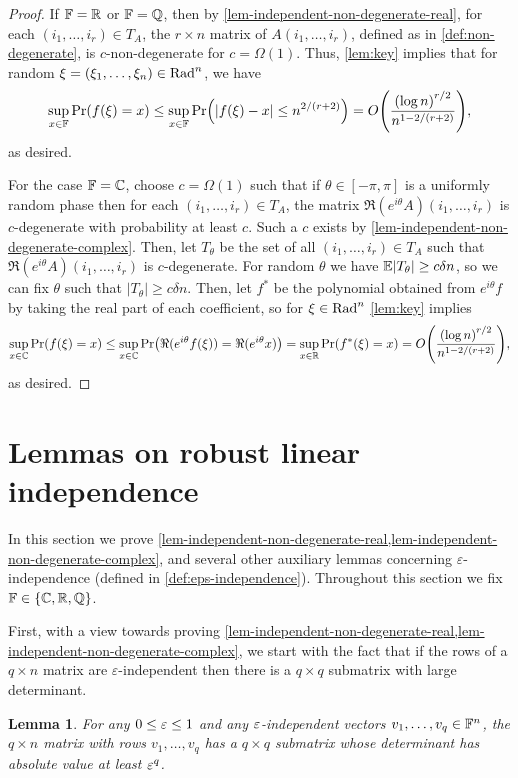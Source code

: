 \documentclass{daj}
\theoremstyle{plain}
\theoremstyle{plain}
\newtheorem{lem}[thm]{Lemma}
\theoremstyle{plain}
\theoremstyle{plain}
\theoremstyle{definition}
\theoremstyle{plain}
\theoremstyle{plain}
\theoremstyle{definition}
\theoremstyle{definition}
\theoremstyle{plain}
\let\originalleft\left
\let\originalright\right
\renewcommand{\left}{\mathopen{}\mathclose\bgroup\originalleft}
\renewcommand{\right}{\aftergroup\egroup\originalright}
\begin{document}
\begin{proof}
If $\mathbb{F}=\mathbb{R}$ or $\mathbb{F}=\mathbb{Q}$, then by \cref{lem-independent-non-degenerate-real}, for each $(i_1,\dots,i_r)\in T_A$, the $r\times n$ matrix of $A(i_1,\dots,i_r)$, defined as in \cref{def:non-degenerate}, is $c$-non-degenerate for $c=\Omega(1)$. Thus, \cref{lem:key} implies that for random $\xi=(\xi_1,\dots,\xi_n)\in \operatorname{Rad}^n$, we have
\[\sup_{x\in \FF}\Pr\left(f(\xi)=x\right)\leq \sup_{x\in \FF}\Pr\left(\left|f\left(\xi\right)-x\right|\le n^{2/\left(r+2\right)}\right)=O\left(\frac{\left(\log n\right)^{r/2}}{n^{1-2/\left(r+2\right)}}\right),\]
as desired.

For the case $\mathbb{F}=\mathbb{C}$, choose $c=\Omega(1)$ such that if $\theta\in [-\pi,\pi]$ is a uniformly random phase then for each $(i_1,\dots,i_r)\in T_A$, the matrix $\Re(e^{i\theta}A)(i_1,\dots,i_r)$ is $c$-degenerate with probability at least $c$. Such a $c$ exists by \cref{lem-independent-non-degenerate-complex}. Then, let $T_\theta$ be the set of all $(i_1,\dots,i_r)\in T_A$ such that $\Re(e^{i\theta}A)(i_1,\dots,i_r)$ is $c$-degenerate. For random $\theta$ we have $\mathbb{E}|T_\theta|\ge c\delta n$, so we can fix $\theta$ such that $|T_\theta|\ge c\delta n$. Then, let $f^*$ be the polynomial obtained from $e^{i\theta} f$ by taking the real part of each coefficient, so for $\xi\in \operatorname{Rad}^n$ \cref{lem:key} implies
\[\sup_{x\in \CC}\Pr\left(f(\xi)=x\right)\leq\sup_{x\in \CC}\Pr\left(\Re(e^{i\theta}f(\xi))=\Re(e^{i\theta}x)\right)= \sup_{x\in \RR}\Pr\left(f^*(\xi)=x\right)=O\left(\frac{\left(\log n\right)^{r/2}}{n^{1-2/\left(r+2\right)}}\right),\]
as desired.
\end{proof}

\section{Lemmas on robust linear independence\label{sec:aux}}

In this section we prove \cref{lem-independent-non-degenerate-real,lem-independent-non-degenerate-complex}, and several other auxiliary lemmas concerning $\varepsilon$-independence (defined in \cref{def:eps-independence}). Throughout this section we fix $\mathbb{F}\in \lbrace \mathbb{C}, \mathbb{R}, \mathbb{Q}\rbrace$.

First, with a view towards proving \cref{lem-independent-non-degenerate-real,lem-independent-non-degenerate-complex}, we start with the fact that if the rows of a $q\times n$ matrix are $\varepsilon$-independent then there is a $q\times q$ submatrix with large determinant.

\begin{lem}\label{lem-large-det-minor}
For any $0\leq \varepsilon\leq 1$ and any $\varepsilon$-independent vectors $v_1,\dots,v_q\in \mathbb{F}^n$, the $q\times n$ matrix with rows $v_1,\dots,v_q$ has a $q\times q$ submatrix whose determinant has absolute value at least $\varepsilon^q$.
\end{lem}
\end{document}
